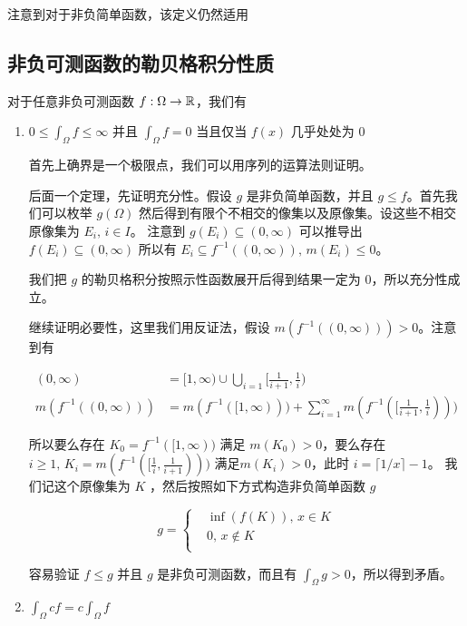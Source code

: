 注意到对于非负简单函数，该定义仍然适用

\subsection{非负可测函数的勒贝格积分性质}

对于任意非负可测函数 $f: \Omega \to \mathbb{R}$，我们有

\begin{enumerate}
    \item $0 \le \int_{\Omega}f \le \infty$ 并且 $\int_{\Omega}f = 0$ 当且仅当 $f(x)$ 几乎处处为 0

    首先上确界是一个极限点，我们可以用序列的运算法则证明。

    后面一个定理，先证明充分性。假设 $g$ 是非负简单函数，并且 $g \le f$。首先我们可以枚举 $g(\Omega)$ 然后得到有限个不相交的像集以及原像集。设这些不相交原像集为 $E_i, \, i \in I$。
    注意到 $g(E_i) \subseteq (0, \infty)$ 可以推导出 $f(E_i) \subseteq (0, \infty)$ 所以有 $E_i \subseteq f^{-1}((0, \infty)),\, m(E_i) \le 0$。

    我们把 $g$ 的勒贝格积分按照示性函数展开后得到结果一定为 $0$，所以充分性成立。

    继续证明必要性，这里我们用反证法，假设 $m(f^{-1}((0, \infty))) > 0$。注意到有

    \begin{align*}
        (0, \infty) &= [1, \infty) \cup \bigcup_{i=1} [\frac{1}{i+1}, \frac{1}{i}) \\
        m(f^{-1}((0, \infty))) &= m(f^{-1}([1, \infty))) + \sum_{i=1}^{\infty}m(f^{-1}([\frac{1}{i+1},\frac{1}{i})))
    \end{align*}

    所以要么存在 $K_0 = f^{-1}([1, \infty))$ 满足 $m(K_0) > 0$，要么存在 $i \ge 1,\, K_i = m(f^{-1}([\frac{1}{i}, \frac{1}{i+1}))) $ 满足$m(K_i) > 0$，此时 $i = \lceil 1/x\rceil - 1$。
    我们记这个原像集为 $K$ ，然后按照如下方式构造非负简单函数 $g$

    \[
        g = \begin{cases}
            & \inf(f(K)),\, x \in K \\
            & 0,\, x \notin K \\
        \end{cases}
    \]

    容易验证 $f \le g$ 并且 $g$ 是非负可测函数，而且有 $\int_{\Omega} g  > 0$，所以得到矛盾。

    \item $\int_{\Omega} cf = c \int_{\Omega} f$


\end{enumerate}
